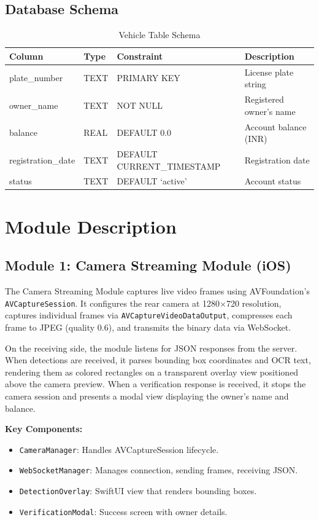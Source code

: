 \documentclass[11pt]{report}
\begin{document}
\subsection{Database Schema}
\begin{table}[H]
\centering
\caption{Vehicle Table Schema}
\renewcommand{\arraystretch}{1.3}
\begin{tabular}{|l|l|l|l|}
\hline
\textbf{Column} & \textbf{Type} & \textbf{Constraint} & \textbf{Description} \\
\hline
plate\_number & TEXT & PRIMARY KEY & License plate string \\
\hline
owner\_name & TEXT & NOT NULL & Registered owner's name \\
\hline
balance & REAL & DEFAULT 0.0 & Account balance (INR) \\
\hline
registration\_date & TEXT & DEFAULT CURRENT\_TIMESTAMP & Registration date \\
\hline
status & TEXT & DEFAULT `active' & Account status \\
\hline
\end{tabular}
\end{table}

\section{Module Description}

\subsection{Module 1: Camera Streaming Module (iOS)}
The Camera Streaming Module captures live video frames using AVFoundation's \texttt{AVCaptureSession}. It configures the rear camera at 1280$\times$720 resolution, captures individual frames via \texttt{AVCaptureVideoDataOutput}, compresses each frame to JPEG (quality 0.6), and transmits the binary data via WebSocket.

On the receiving side, the module listens for JSON responses from the server. When detections are received, it parses bounding box coordinates and OCR text, rendering them as colored rectangles on a transparent overlay view positioned above the camera preview. When a verification response is received, it stops the camera session and presents a modal view displaying the owner's name and balance.

\textbf{Key Components:}
\begin{itemize}
    \item \texttt{CameraManager}: Handles AVCaptureSession lifecycle.
    \item \texttt{WebSocketManager}: Manages connection, sending frames, receiving JSON.
    \item \texttt{DetectionOverlay}: SwiftUI view that renders bounding boxes.
    \item \texttt{VerificationModal}: Success screen with owner details.
\end{itemize}
\end{document}
